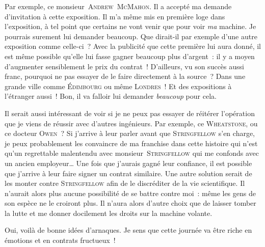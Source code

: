 {Par exemple, ce monsieur~\textsc{Andrew~McMahon}.
Il a accepté ma demande d’invitation à cette exposition.
Il m’a même mis en première loge dans l’exposition, à tel point que certains ne vont venir que pour voir \emph{ma} machine.
Je pourrais surement lui demander beaucoup.  Que dirait-il par exemple d’une autre exposition comme celle-ci~?
Avec la publicité que cette première lui aura donné, il est même possible qu’elle lui fasse gagner beaucoup plus d’argent~:  il y a moyen d’augmenter sensiblement le prix du contrat~!
D’ailleurs, vu son succès aussi franc, pourquoi ne pas essayer de le faire directement à la source~?  Dans une grande ville comme \textsc{Édimbourg} ou même \textsc{Londres}~!
Et des expositions à l’étranger aussi~!
Bon, il va falloir lui demander \emph{beaucoup} pour cela.

Il serait aussi intéressant de voir si je ne peux pas essayer de réitérer l’opération que je viens de réussir avec d’autres ingénieurs.
Par exemple, ce \textsc{Wheatstone}, ou ce docteur \textsc{Owen}~?
Si j’arrive à leur parler avant que \textsc{Stringfellow} s’en charge, je peux probablement les convaincre de ma franchise dans cette histoire qui n’est qu’un regrettable malentendu avec monsieur~\textsc{Stringfellow} qui me confonds avec un ancien employeur…
Une fois que j’aurais gagné leur confiance, il est possible que j’arrive à leur faire signer un contrat similaire.
Une autre solution serait de les monter contre \textsc{Stringfellow} afin de le discréditer de la vie scientifique.
Il n’aurait alors plus aucune possibilité de se battre contre moi~:  même les gens de son espèce ne le croiront plus.
Il n’aura alors d’autre choix que de laisser tomber la lutte et me donner docilement les droits sur la machine volante.

Oui, voilà de bonne idées d’arnaques.
Je sens que cette journée va être riche en émotions et en contrats fructueux~!
}


